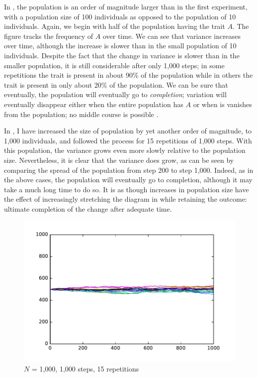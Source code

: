 \documentclass[output=paper]{langsci/langscibook}
\begin{document}
In , the population is an order of magnitude
larger than in the first experiment, with a population size of 100
individuals as opposed to the population of 10 individuals.  Again, we
begin with half of the population having the trait $A$. The figure
tracks the frequency of $A$ over time.  We can see that
variance increases over time, although the increase is slower than in
the small population of 10 individuals.  Despite the fact that the
change in variance is slower than in the smaller population, it is
still considerable after only 1,000 steps; in some repetitions the
trait is present in about 90\% of the population while in others the
trait is present in only about 20\% of the population.  We can be sure
that eventually, the population will eventually go to
\emph{completion}; variation will eventually disappear either when the
entire population has $A$ or when is vanishes from the population; no
middle course is possible \citep{sigmund:1993}.

In , I have increased the size of population by
yet another order of magnitude, to 1,000 individuals, and followed the
process for 15 repetitions of 1,000 steps.  With this population, the
variance grows even more slowly relative to the population size.
Nevertheless, it is clear that the variance does grow, as can be seen
by comparing the spread of the population from step 200 to step 1,000.
Indeed, as in the above cases, the population will eventually go to
completion, although it may take a much long time to do so.  It is as
though increases in population size have the effect of increasingly
stretching the diagram in  while retaining the
outcome: ultimate completion of the change after adequate time.

\begin{figure}[ht]
   \centering
    \includegraphics[width=.8\linewidth]{./img/pop1000_1000.pdf}
    \caption{$N$ = 1,000, 1,000 steps, 15 repetitions}
    \label{random_fig3}
\end{figure}
\end{document}
